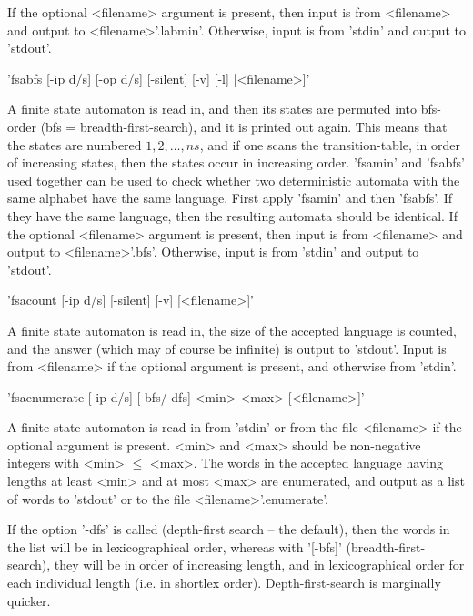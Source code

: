 If the optional <filename> argument is present, then input is from <filename>
and output to <filename>'.labmin'. Otherwise, input is from 'stdin' and
output to 'stdout'.


'fsabfs [-ip d/s] [-op d/s] [-silent] [-v] [-l] [<filename>]'

A finite state automaton is read in, and then its states are permuted into
bfs-order (bfs = breadth-first-search), and it is printed out again.
This means that the states are numbered $1,2, \ldots, ns$, and if one
scans the transition-table, in order of increasing states, then the states
occur in increasing order. 'fsamin' and 'fsabfs' used together can be used
to check whether two deterministic automata with the same alphabet
have the same language.
First apply 'fsamin' and then 'fsabfs'.
If they have the same language, then the resulting automata should be identical.
If the optional <filename> argument is present, then input is from <filename>
and output to <filename>'.bfs'. Otherwise, input is from 'stdin' and
output to 'stdout'.


'fsacount  [-ip d/s] [-silent] [-v] [<filename>]'

A finite state automaton is read in,
the size of the accepted language is counted, and the answer (which may
of course be infinite) is output to 'stdout'.
Input is from <filename> if
the optional argument is present, and otherwise from 'stdin'.


'fsaenumerate  [-ip d/s] [-bfs/-dfs] <min> <max> [<filename>]'

A finite state automaton is read in from 'stdin' or from the file <filename>
if the optional argument is present.
<min> and <max> should be non-negative integers with <min> $\le$ <max>.
The words in the accepted language having lengths at least <min> and at
most <max> are enumerated, and output as a list of words to 'stdout' or
to the file <filename>'.enumerate'.

If the option '-dfs' is called (depth-first search -- the default),
then the words
in the list will be in lexicographical order, whereas with '[-bfs]'
(breadth-first-search), they will be in order of increasing length, and in
lexicographical order for each individual length (i.e. in shortlex order).
Depth-first-search is marginally quicker.


